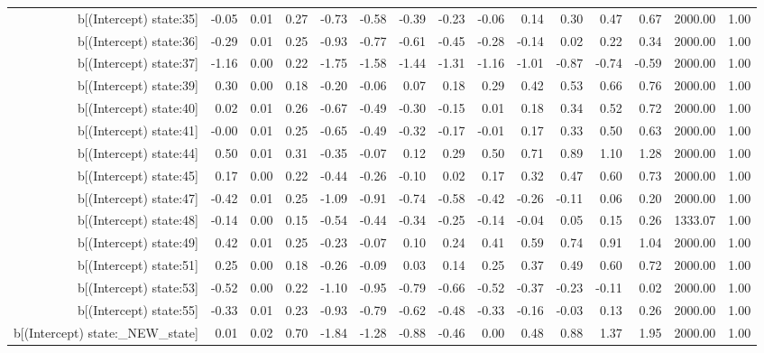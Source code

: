 \begin{table}[ht]
\begin{tabular}{rrrrrrrrrrrrrrr}
  b[(Intercept) state:35] & -0.05 & 0.01 & 0.27 & -0.73 & -0.58 & -0.39 & -0.23 & -0.06 & 0.14 & 0.30 & 0.47 & 0.67 & 2000.00 & 1.00 \\ 
  b[(Intercept) state:36] & -0.29 & 0.01 & 0.25 & -0.93 & -0.77 & -0.61 & -0.45 & -0.28 & -0.14 & 0.02 & 0.22 & 0.34 & 2000.00 & 1.00 \\ 
  b[(Intercept) state:37] & -1.16 & 0.00 & 0.22 & -1.75 & -1.58 & -1.44 & -1.31 & -1.16 & -1.01 & -0.87 & -0.74 & -0.59 & 2000.00 & 1.00 \\ 
  b[(Intercept) state:39] & 0.30 & 0.00 & 0.18 & -0.20 & -0.06 & 0.07 & 0.18 & 0.29 & 0.42 & 0.53 & 0.66 & 0.76 & 2000.00 & 1.00 \\ 
  b[(Intercept) state:40] & 0.02 & 0.01 & 0.26 & -0.67 & -0.49 & -0.30 & -0.15 & 0.01 & 0.18 & 0.34 & 0.52 & 0.72 & 2000.00 & 1.00 \\ 
  b[(Intercept) state:41] & -0.00 & 0.01 & 0.25 & -0.65 & -0.49 & -0.32 & -0.17 & -0.01 & 0.17 & 0.33 & 0.50 & 0.63 & 2000.00 & 1.00 \\ 
  b[(Intercept) state:44] & 0.50 & 0.01 & 0.31 & -0.35 & -0.07 & 0.12 & 0.29 & 0.50 & 0.71 & 0.89 & 1.10 & 1.28 & 2000.00 & 1.00 \\ 
  b[(Intercept) state:45] & 0.17 & 0.00 & 0.22 & -0.44 & -0.26 & -0.10 & 0.02 & 0.17 & 0.32 & 0.47 & 0.60 & 0.73 & 2000.00 & 1.00 \\ 
  b[(Intercept) state:47] & -0.42 & 0.01 & 0.25 & -1.09 & -0.91 & -0.74 & -0.58 & -0.42 & -0.26 & -0.11 & 0.06 & 0.20 & 2000.00 & 1.00 \\ 
  b[(Intercept) state:48] & -0.14 & 0.00 & 0.15 & -0.54 & -0.44 & -0.34 & -0.25 & -0.14 & -0.04 & 0.05 & 0.15 & 0.26 & 1333.07 & 1.00 \\ 
  b[(Intercept) state:49] & 0.42 & 0.01 & 0.25 & -0.23 & -0.07 & 0.10 & 0.24 & 0.41 & 0.59 & 0.74 & 0.91 & 1.04 & 2000.00 & 1.00 \\ 
  b[(Intercept) state:51] & 0.25 & 0.00 & 0.18 & -0.26 & -0.09 & 0.03 & 0.14 & 0.25 & 0.37 & 0.49 & 0.60 & 0.72 & 2000.00 & 1.00 \\ 
  b[(Intercept) state:53] & -0.52 & 0.00 & 0.22 & -1.10 & -0.95 & -0.79 & -0.66 & -0.52 & -0.37 & -0.23 & -0.11 & 0.02 & 2000.00 & 1.00 \\ 
  b[(Intercept) state:55] & -0.33 & 0.01 & 0.23 & -0.93 & -0.79 & -0.62 & -0.48 & -0.33 & -0.16 & -0.03 & 0.13 & 0.26 & 2000.00 & 1.00 \\ 
  b[(Intercept) state:\_NEW\_state] & 0.01 & 0.02 & 0.70 & -1.84 & -1.28 & -0.88 & -0.46 & 0.00 & 0.48 & 0.88 & 1.37 & 1.95 & 2000.00 & 1.00 \\ 

\end{tabular}
\end{table}
